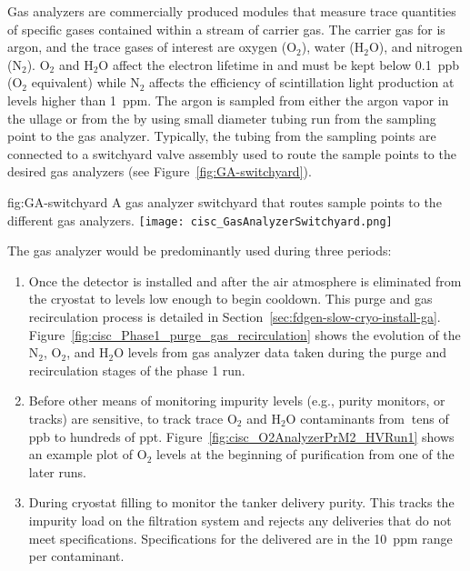 Gas analyzers are commercially produced modules that measure trace quantities of specific gases contained within a stream of carrier gas. The carrier gas for  is argon, and the trace gases of interest are oxygen ($\text{O}_2$), water ($\text{H}_2\text{O}$), and nitrogen ($\text{N}_2$). $\text{O}_2$ and $\text{H}_2\text{O}$ affect the electron lifetime in  and must be kept below \SI{0.1}{ppb} ($\text{O}_2$ equivalent) while $\text{N}_2$ affects the efficiency of scintillation light production at levels higher than \SI{1}{ppm}.
The argon is sampled from either the argon vapor in the ullage or from the  by using small diameter tubing run from the sampling point to the gas analyzer. Typically, the tubing from the sampling points are connected to a switchyard valve assembly used to route the sample points to the desired gas analyzers (see Figure~\ref{fig:GA-switchyard}).


\begin{dunefigure}{fig:GA-switchyard}
  {A gas analyzer switchyard that routes sample points to the different gas analyzers.}
  \texttt{[image: cisc\_GasAnalyzerSwitchyard.png]}
\end{dunefigure}

The gas analyzer would be predominantly used during three periods:

\begin{enumerate}
\item Once the detector is installed and after the air atmosphere is eliminated from the cryostat to levels low enough to begin cooldown. This purge and gas recirculation process is detailed in Section~\ref{sec:fdgen-slow-cryo-install-ga}. Figure~\ref{fig:cisc_Phase1_purge_gas_recirculation} shows the evolution of the $\text{N}_2$, $\text{O}_2$, and $\text{H}_2\text{O}$ levels from gas analyzer data taken during the purge and recirculation stages of the   %
phase 1 run.


\item Before other means of monitoring impurity levels (e.g., purity monitors, or  tracks) are sensitive, to track trace $\text{O}_2$ and $\text{H}_2\text{O}$ contaminants from $\>$tens of ppb to hundreds of ppt.  Figure~\ref{fig:cisc_O2AnalyzerPrM2_HVRun1} shows an example plot of $\text{O}_2$ levels at the beginning of  purification from one of the later   runs.

\item During cryostat filling to monitor the tanker  delivery purity. This tracks the impurity load on the filtration system and rejects any deliveries that do not meet specifications. %
Specifications for the delivered  are in the \SI{10}{ppm} range per contaminant.

\end{enumerate}

